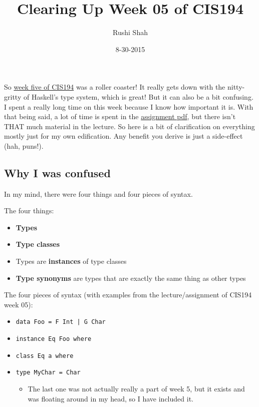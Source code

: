 \documentclass[12pt]{article}
\title{Clearing Up Week 05 of CIS194}
\author{Rushi Shah}
\date{8-30-2015}
\newcommand{\tightlist}{\setlength{\itemsep}{0pt}\setlength{\parskip}{0pt}}
\begin{document}
  \maketitle

So \href{http://www.seas.upenn.edu/~cis194/spring13/lectures/05-type-classes.html}{week
five of CIS194} was a roller coaster! It really gets down with the
nitty-gritty of Haskell's type system, which is great! But it can also
be a bit confusing. I spent a really long time on this week because I
know how important it is. With that being said, a lot of time is spent
in the
\href{http://www.seas.upenn.edu/~cis194/spring13/hw/05-type-classes.pdf}{assignment
pdf}, but there isn't THAT much material in the lecture. So here is a
bit of clarification on everything mostly just for my own edification.
Any benefit you derive is just a side-effect (hah, puns!).

\subsection{Why I was confused}\label{why-i-was-confused}

In my mind, there were four things and four pieces of syntax.

The four things:

\begin{itemize}
\tightlist
\item
  \textbf{Types}
\item
  \textbf{Type classes}
\item
  Types are \textbf{instances} of type classes
\item
  \textbf{Type synonyms} are types that are exactly the same thing as
  other types
\end{itemize}

The four pieces of syntax (with examples from the lecture/assignment of
CIS194 week 05):

\begin{itemize}
\tightlist
\item
  \texttt{data\ Foo\ =\ F\ Int\ |\ G\ Char}
\item
  \texttt{instance\ Eq\ Foo\ where}
\item
  \texttt{class\ Eq\ a\ where}
\item
  \texttt{type\ MyChar\ =\ Char}
  \begin{itemize}
    \tightlist
    \item
      The last one was not actually really a part of week 5, but it exists and was
      floating around in my head, so I have included it.
  \end{itemize}
\end{itemize}
\end{document}
